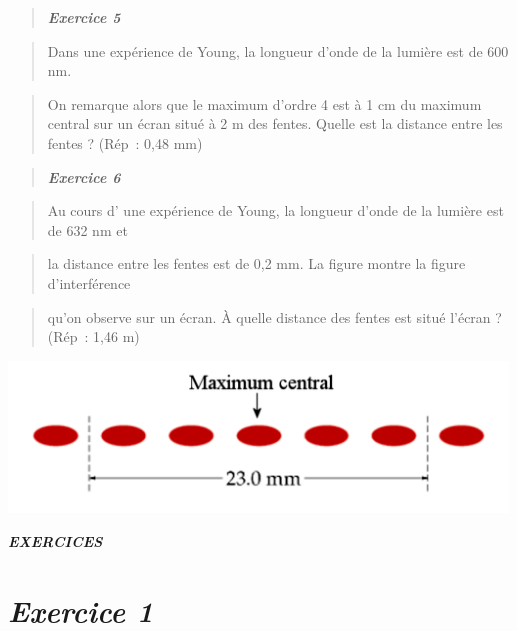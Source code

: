 \begin{quote}
\emph{\textbf{Exercice 5}}
\end{quote}

\begin{quote}
Dans une expérience de Young, la longueur d'onde de la lumière est de
600 nm.
\end{quote}

\begin{quote}
On remarque alors que le maximum d'ordre 4 est à 1 cm du maximum central
sur un écran situé à 2 m des fentes. Quelle est la distance entre les
fentes\textbf{ }? (Rép~: 0,48 mm)
\end{quote}

\begin{quote}
\end{quote}

\begin{quote}
\emph{\textbf{Exercice 6}}
\end{quote}

\begin{quote}
Au cours d' une expérience de Young, la longueur d'onde de la lumière
est de 632 nm et
\end{quote}

\begin{quote}
la distance entre les fentes est de 0,2 mm. La figure montre la figure
d'interférence
\end{quote}

\begin{quote}
qu'on observe sur un écran. À quelle distance des fentes est situé
l'écran\textbf{ }? (Rép~: 1,46 m)
\end{quote}

\includegraphics[width=13.259cm,height=4.045cm]{Pictures/100000010000059F000001B75001F99348A6D888.png}

\emph{\textbf{EXERCICES}}

\hypertarget{exercice-1-1}{%
\section{\texorpdfstring{\emph{Exercice
1}}{Exercice 1}}\label{exercice-1-1}}

